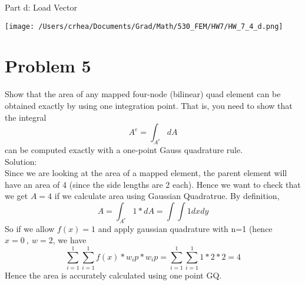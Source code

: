 \documentclass[11pt]{amsart}
\begin{document}
Part d: Load Vector \\
\begin{center}
\texttt{[image: /Users/crhea/Documents/Grad/Math/530\_FEM/HW7/HW\_7\_4\_d.png]}
\end{center}

\section{Problem 5}
Show that the area of any mapped four-node (bilinear) quad element can be
obtained exactly by using one integration point. That is, you need to show that the
integral
$$A^e = \int_{A^e}dA $$
can be computed exactly with a one-point Gauss quadrature rule.\\
Solution:\\
Since we are looking at the area of a mapped element, the parent element will have an area of 4 (since the side lengths are 2 each). Hence we want to check that we get $A=4$ if we calculate area using Gaussian Quadratrue.
By definition, 
$$A = \int_{A^e}1*dA = \int \int 1 dx dy$$
So if we allow $f(x)=1$ and apply gaussian quadrature with n=1 (hence $x=0 \ , \ w=2$, we have
$$\sum_{i=1}^1 \sum_{i=1}^1 f(x)*w_ip*w_ip = \sum_{i=1}^1 \sum_{i=1}^1 1*2*2 = 4$$
Hence the area is accurately calculated using one point GQ.
\end{document}
